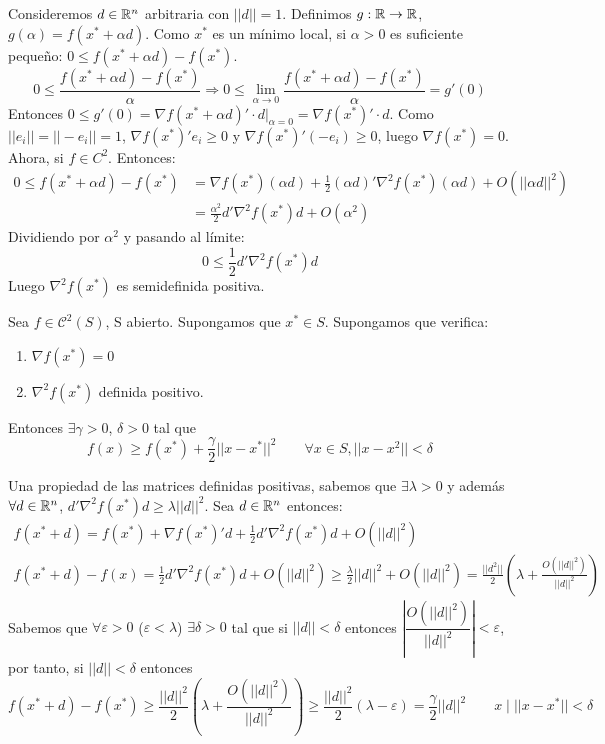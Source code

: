 \documentclass[PM.tex]{subfiles}
\begin{document}
\begin{dem} Consideremos $d \in \mathbb{R}^n$ arbitraria con $||d||=1$. Definimos $g : \mathbb{R} \to \mathbb{R}$, $g(α) = f(x^* + α d)$. Como $x^*$ es un mínimo local, si $α > 0$ es suficiente pequeño: $0 ≤ f(x^*+αd)-f(x^*)$.
\[ 0 ≤ \frac{f(x^*+αd)-f(x^*)}{α} \Rightarrow 0 ≤ \lim_{α \to 0} \frac{f(x^*+αd)-f(x^*)}{α} = g'(0) \]
Entonces $0 ≤ g'(0) = \nabla f (x^*+αd)'\cdot d |_{α = 0} = \nabla f(x^*)'\cdot d$. 
Como $||e_i|| = ||-e_i|| = 1$, $\nabla f(x^*)'e_i ≥ 0$ y $\nabla f(x^*)'(-e_i) ≥ 0$, luego $\nabla f(x^*) = 0$. Ahora, si $f \in C^2$. Entonces:
\begin{align*} 0 ≤ f(x^* + α d)-f(x^*) & = \nabla f(x^*)(αd) + \frac{1}{2} (αd)' \nabla^2 f(x^*)(αd) + O(||αd||^2) \\
 & = \frac{α^2}{2}d'\nabla^2f(x^*)d + O(α^2)
\end{align*}
Dividiendo por $α^2$ y pasando al límite:
\[ 0 ≤ \frac{1}{2} d' \nabla^2 f(x^*) d \]
Luego $\nabla^2 f(x^*)$ es semidefinida positiva.
\end{dem}
\begin{theorem}[C. S.] Sea $f\in \mathcal{C}^2(S)$, S abierto. Supongamos que $x^*\in S$. Supongamos que verifica:
\begin{enumerate}
\item $\nabla f(x^*)=0$
\item $\nabla^2 f(x^*)$ definida positivo.
\end{enumerate}
Entonces $\exists \gamma>0$, $\delta>0$ tal que 
\[
f(x)\geq f(x^*)+\frac{\gamma}{2}||x-x^*||^2 \qquad \forall x\in S, ||x-x^2||<\delta
\]
\end{theorem}
\begin{dem}
Una propiedad de las matrices definidas positivas, sabemos que $\exists \lambda>0$ y además $\forall d\in \mathbb{R}^n$, $d'\nabla^2 f(x^*) d\geq \lambda ||d||^2$. Sea $d\in \mathbb{R}^n$ entonces:
\begin{gather*}
f(x^*+d)=f(x^*)+\nabla f(x^*)'d +\frac{1}{2}d'\nabla^2 f(x^*)d+O(||d||^2) \\
f(x^*+d)-f(x) =  \frac{1}{2}d'\nabla^2 f(x^*)d+O(||d||^2) \geq  \frac{\lambda}{2}||d||^2 + O(||d||^2) = \frac{||d^2||}{2}\left(\lambda+\frac{O(||d||^2)}{||d||^2}\right)
\end{gather*}
Sabemos que $\forall \varepsilon>0$ ($\varepsilon < \lambda$) $\exists \delta >0$ tal que si $||d||<\delta$ entonces $\left|\dfrac{O(||d||^2)}{||d||^2}\right|<\varepsilon$, por tanto, si $||d||<\delta$ entonces
\[
f(x^*+d)-f(x^*)\geq  \frac{||d||^2}{2}\left(\lambda+\frac{O(||d||^2)}{||d||^2}\right) \geq  \frac{||d||^2}{2}\left(\lambda-\varepsilon\right) =  \frac{\gamma}{2}||d||^2 \qquad x \mid ||x-x^*||<\delta 
\]
\end{dem}
\end{document}
